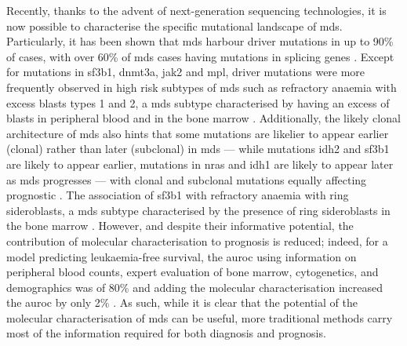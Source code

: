 Recently, thanks to the advent of next-generation sequencing technologies, it is now possible to characterise the specific mutational landscape of \ac{mds}. Particularly, it has been shown that \ac{mds} harbour driver mutations in up to 90\% of cases, with over 60\% of \ac{mds} cases having mutations in splicing genes \cite{Papaemmanuil2013-yt,Haferlach2014-bh}. Except for mutations in \ac{sf3b1}, \ac{dnmt3a}, \ac{jak2} and \ac{mpl}, driver mutations were more frequently observed in high risk subtypes of \ac{mds} such as refractory anaemia with excess blasts types 1 and 2, a \ac{mds} subtype characterised by having an excess of blasts in peripheral blood and in the bone marrow \cite{Haferlach2014-bh}. Additionally, the likely clonal architecture of \ac{mds} also hints that some mutations are likelier to appear earlier (clonal) rather than later (subclonal) in \ac{mds} --- while mutations \ac{idh2} and \ac{sf3b1} are likely to appear earlier, mutations in \ac{nras} and \ac{idh1} are likely to appear later as \ac{mds} progresses --- with clonal and subclonal mutations equally affecting prognostic \cite{Papaemmanuil2013-yt}. The association of \ac{sf3b1} with refractory anaemia with ring sideroblasts, a \ac{mds} subtype characterised by the presence of ring sideroblasts in the bone marrow \cite{PaPapaemmanuil2011-nr Papaemmanuil2013-yt, Haferlach2014-bh}. However, and despite their informative potential, the contribution of molecular characterisation to prognosis is reduced; indeed, for a model predicting leukaemia-free survival, the \ac{auroc} using information on peripheral blood counts, expert evaluation of bone marrow, cytogenetics, and demographics was of 80\% and adding the molecular characterisation increased the \ac{auroc} by only 2\% \cite{Papaemmanuil2013-yt}. As such, while it is clear that the potential of the molecular characterisation of \ac{mds} can be useful, more traditional methods carry most of the information required for both diagnosis and prognosis.

